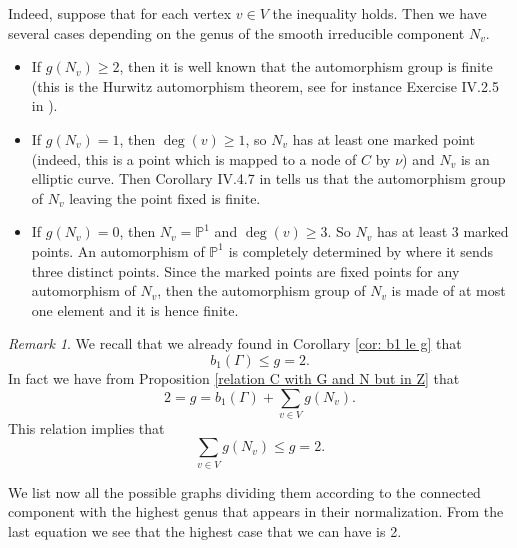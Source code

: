 \documentclass[a4paper,12 pt,titlepage,twoside]{book}
\newcommand{\Ps}{\mathbb{P}}
\theoremstyle{plain}
\theoremstyle{theorem}
\theoremstyle{definition}
\theoremstyle{remark}
\newtheorem{oss}[thm]{Remark}
\begin{document}
	Indeed, suppose that for each vertex $v \in V$ the inequality holds. Then we have several cases depending on the genus of the smooth irreducible component $N_v.$ \begin{itemize}
		\item If $g(N_v)\ge 2$, then it is well known that the automorphism group is finite (this is the Hurwitz automorphism theorem, see for instance Exercise IV.2.5 in \cite{MR0463157}).
		\item If $g(N_v)=1$, then $\deg(v) \ge 1$, so $N_v$ has at least one marked point (indeed, this is a point which is mapped to a node of $C$ by $\nu$) and $N_v$ is an elliptic curve. Then Corollary IV.4.7 in \cite{MR0463157} tells us that the automorphism group of $N_v$ leaving the point fixed is finite.
		\item If $g(N_v)=0$, then $N_v= \Ps^1$ and $\deg(v)\ge 3$. So $N_v$ has at least 3 marked points. An automorphism of $\Ps^1$ is completely determined by where it sends three distinct points. Since the marked points are fixed points for any automorphism of $N_v$, then the automorphism group of $N_v$ is made of at most one element and it is hence finite.
	\end{itemize}
	\begin{oss}
		We recall that we already found in Corollary \ref{cor: b1 le g} that $$b_1(\Gamma) \le g=2.$$ In fact we have from Proposition \ref{relation C with G and N but in Z} that $$2=g = b_1(\Gamma) + \sum_{v \in V} g(N_v).$$ This relation implies that $$\sum_{v \in V} g(N_v) \le g=2.$$
	\end{oss}
	We list now all the possible graphs dividing them according to the connected component with the highest genus that appears in their normalization. From the last equation we see that the highest case that we can have is 2.
\end{document}
